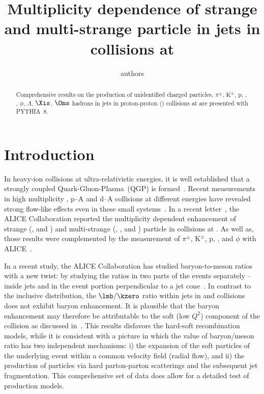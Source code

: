 \documentclass[ALICE,manyauthors]{StrinJet}
\begin{document}
\title{Multiplicity dependence of strange and multi-strange particle in jets in \pp collisions at \seven}
\author{authors}
\begin{abstract}
	\label{sec:Abs}
Comprehensive results on the production of unidentified charged particles, $\pi^{\pm}$, $\mathrm{K^{\pm}}$, p, \kzero, \kstar, $\phi$, $\Lambda$, $\Xis$, $\Oms$ hadrons in jets in proton-proton (\pp) collisions at \seven  are presented with PYTHIA~8.
\end{abstract}


\setcounter{page}{1}


\clearpage
\section{Introduction}
\label{sec:intro}
In heavy-ion collisions at ultra-relativistic energies, it is well established that a strongly coupled Quark-Gluon-Plasma~(QGP) is formed~\cite{Adams:2005dq, Adcox:2004mh, Arsene:2004fa, Back:2004je, Schukraft:2011na}.
Recent measurements in high multiplicity \pp, p--A and d--A collisions at different energies have revealed strong flow-like effects even in these small systems~\cite{Abelev:2012sk, Chatrchyan:2013eya, Khachatryan:2010gv, CMS:2012qk, Abelev:2012ola, Aad:2012gla, Aad:2013fja, Chatrchyan:2013nka, Adare:2013esx, Adams:2006nd}.
In a recent letter~\cite{ALICE:2016fzo}, the ALICE Collaboration reported the multiplicity dependent enhancement of strange (\kzero, \lmb and \almb) and multi-strange (\X, \Ix, \Om and \Mo) particle in \pp collisions at \seven. As well as, those results were complemented by the measurement of $\pi^{\pm}$, $\mathrm{K}^{\pm}$, p, \pbar, \kstar and $\phi$ with ALICE~\cite{ALICE:2018pal}.


In a recent study, the ALICE Collaboration has studied baryon-to-meson ratios with a new twist: by studying the ratios in two parts of the events separately -- inside jets and in the event portion perpendicular to a jet cone~\cite{ALICE:2021cvd}. 
In contrast to the inclusive distribution, the $\lmb/\kzero$ ratio within jets in \pp and \pPb collisions does not exhibit baryon enhancement.
It is plausible that the baryon enhancement may therefore be attributable to the soft (low $Q^{2}$) component of the collision as discussed in~\cite{Cuautle:2014yda}.
This results disfavors the hard-soft recombination models, while it is consistent with a picture in which the value of baryon/meson ratio has two independent mechanisms: i) the expansion of the soft particles of the underlying event within  a common velocity field (radial flow), and ii) the production of particles via hard parton-parton scatterings and the subsequent jet fragmentation.
This comprehensive set of data does allow for a detailed test of production models.
\end{document}
